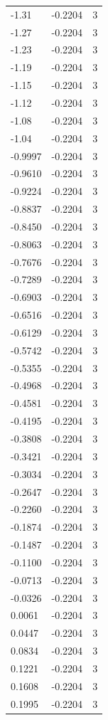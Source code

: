 \begin{longtable}{lrr}
  -1.31 & -0.2204 & 3 \\
  -1.27 & -0.2204 & 3 \\
  -1.23 & -0.2204 & 3 \\
  -1.19 & -0.2204 & 3 \\
  -1.15 & -0.2204 & 3 \\
  -1.12 & -0.2204 & 3 \\
  -1.08 & -0.2204 & 3 \\
  -1.04 & -0.2204 & 3 \\
  -0.9997 & -0.2204 & 3 \\
  -0.9610 & -0.2204 & 3 \\
  -0.9224 & -0.2204 & 3 \\
  -0.8837 & -0.2204 & 3 \\
  -0.8450 & -0.2204 & 3 \\
  -0.8063 & -0.2204 & 3 \\
  -0.7676 & -0.2204 & 3 \\
  -0.7289 & -0.2204 & 3 \\
  -0.6903 & -0.2204 & 3 \\
  -0.6516 & -0.2204 & 3 \\
  -0.6129 & -0.2204 & 3 \\
  -0.5742 & -0.2204 & 3 \\
  -0.5355 & -0.2204 & 3 \\
  -0.4968 & -0.2204 & 3 \\
  -0.4581 & -0.2204 & 3 \\
  -0.4195 & -0.2204 & 3 \\
  -0.3808 & -0.2204 & 3 \\
  -0.3421 & -0.2204 & 3 \\
  -0.3034 & -0.2204 & 3 \\
  -0.2647 & -0.2204 & 3 \\
  -0.2260 & -0.2204 & 3 \\
  -0.1874 & -0.2204 & 3 \\
  -0.1487 & -0.2204 & 3 \\
  -0.1100 & -0.2204 & 3 \\
  -0.0713 & -0.2204 & 3 \\
  -0.0326 & -0.2204 & 3 \\
  0.0061 & -0.2204 & 3 \\
  0.0447 & -0.2204 & 3 \\
  0.0834 & -0.2204 & 3 \\
  0.1221 & -0.2204 & 3 \\
  0.1608 & -0.2204 & 3 \\
  0.1995 & -0.2204 & 3 \\

\end{longtable}
